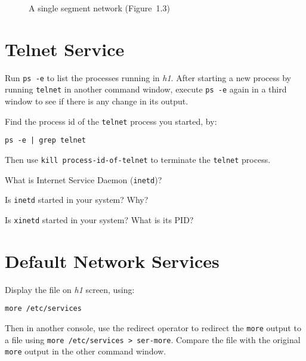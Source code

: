 \documentclass{../UTNetLab}
\begin{document}
\begin{center}
\begin{minipage}{0.48\textwidth}
\begin{flushright}
\begin{figure}[H]
                    \caption{A single segment network (Figure~1.3)}
                \end{figure}
            \end{flushright}
        \end{minipage}
    \end{center}

\section{Telnet Service}
    Run \lstinline{ps -e} to list the processes running in \textit{h1}.
    After starting a new process by running \lstinline{telnet} in another command window, execute \lstinline{ps -e} again in a third window to see if there is any change in its output.

    Find the process id of the \lstinline{telnet} process you started, by:
    \begin{lstlisting}
ps -e | grep telnet
    \end{lstlisting}
    Then use \lstinline[emph={process-id-of-telnet}]{kill process-id-of-telnet} to terminate the \lstinline{telnet} process.
    
    \begin{report}
    \item What is Internet Service Daemon (\lstinline{inetd})?

    \item Is \lstinline{inetd} started in your system?
    Why?

    \item Is \lstinline{xinetd} started in your system? What is its PID?
    \end{report}

\section{Default Network Services}
    Display the file  on \textit{h1} screen, using:
    \begin{lstlisting}
more /etc/services
    \end{lstlisting}
    Then in another console, use the redirect operator to redirect the \lstinline{more} output to
    a file using \lstinline{more /etc/services > ser-more}. Compare the file  with the original \lstinline{more} output in the other command window.
\end{document}
